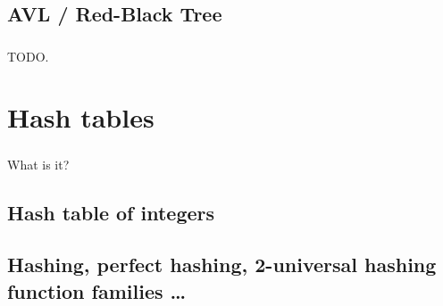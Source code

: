 \documentclass{beamer}
\begin{document}
\subsection{AVL / Red-Black Tree}

\begin{frame}
    \frametitle{}
    TODO.
\end{frame}

\section{Hash tables}

\begin{frame}
    \frametitle{}
    What is it?
\end{frame}

\subsection{Hash table of integers}

\begin{frame}
    \frametitle{}
\end{frame}

\subsection{Hashing, perfect hashing, 2-universal hashing function families \dots}
\end{document}

